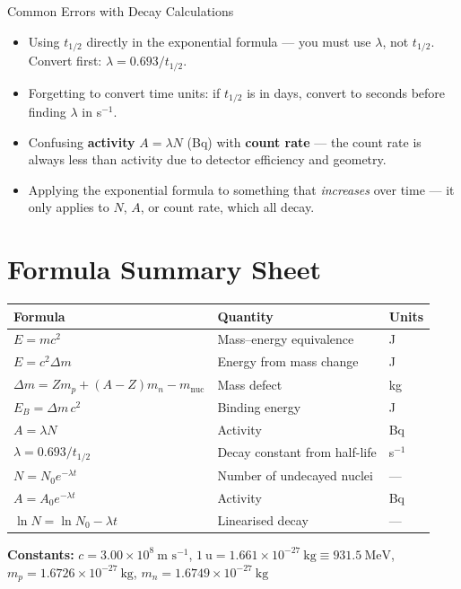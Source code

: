\begin{warningbox}{Common Errors with Decay Calculations}
\begin{itemize}[itemsep=3pt]
  \item Using $t_{1/2}$ directly in the exponential formula — you must use $\lambda$, not $t_{1/2}$. Convert first: $\lambda = 0.693/t_{1/2}$.
  \item Forgetting to convert time units: if $t_{1/2}$ is in days, convert to seconds before finding $\lambda$ in s$^{-1}$.
  \item Confusing \textbf{activity} $A = \lambda N$ (Bq) with \textbf{count rate} — the count rate is always less than activity due to detector efficiency and geometry.
  \item Applying the exponential formula to something that \emph{increases} over time — it only applies to $N$, $A$, or count rate, which all decay.
\end{itemize}
\end{warningbox}

\section{Formula Summary Sheet}

\begin{minipage}{\linewidth}
\begin{tcolorbox}[colback=lightgold, colframe=accentgold]
\renewcommand{\arraystretch}{1.8}
\begin{tabular}{@{}lll@{}}
\toprule
\textbf{Formula} & \textbf{Quantity} & \textbf{Units} \\
\midrule
$E = mc^2$ & Mass--energy equivalence & J \\
$E = c^2\Delta m$ & Energy from mass change & J \\
$\Delta m = Zm_p + (A{-}Z)m_n - m_\text{nuc}$ & Mass defect & kg \\
$E_B = \Delta m\,c^2$ & Binding energy & J \\
$A = \lambda N$ & Activity & Bq \\
$\lambda = 0.693/t_{1/2}$ & Decay constant from half-life & s$^{-1}$ \\
$N = N_0 e^{-\lambda t}$ & Number of undecayed nuclei & --- \\
$A = A_0 e^{-\lambda t}$ & Activity & Bq \\
$\ln N = \ln N_0 - \lambda t$ & Linearised decay & --- \\
\bottomrule
\end{tabular}
\end{tcolorbox}

\vspace{0.5em}
\begin{tcolorbox}[colback=lightblue, colframe=darkblue]
\textbf{Constants:}\quad
$c = 3.00\times10^{8}\ \text{m s}^{-1}$,\quad
$1\ \text{u} = 1.661\times10^{-27}\ \text{kg} \equiv 931.5\ \text{MeV}$,\quad
$m_p = 1.6726\times10^{-27}\ \text{kg}$,\quad
$m_n = 1.6749\times10^{-27}\ \text{kg}$
\end{tcolorbox}
\end{minipage}

